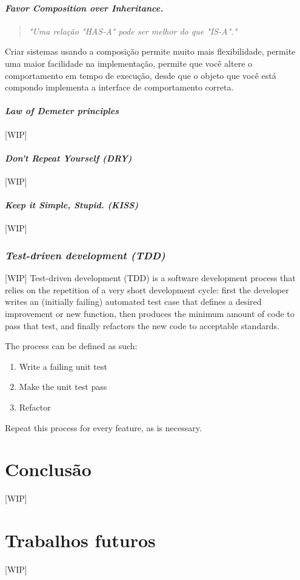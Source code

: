 \documentclass[12pt]{article}
\begin{document}
\subsection{\textit{Favor Composition over Inheritance.}} \label{sec:favor_composition}
\begin{quote}
\textit{"Uma relação "HAS-A" pode ser melhor do que "IS-A"."}\cite{HEADFIRST_DESIGN_PATTERN}
\end{quote}

Criar sistemas usando a composição permite muito mais flexibilidade, permite uma maior facilidade na implementação, permite que você altere o comportamento em tempo de execução, desde que o objeto que você está compondo implementa a interface de comportamento correta. 


\subsection{\textit{Law of Demeter principles}} \label{sec:law_of_demeter}
[WIP]

\subsection{\textit{Don't Repeat Yourself (DRY)}} \label{sec:dey}
[WIP]

\subsection{\textit{Keep it Simple, Stupid. (KISS)}} \label{sec:kiss}
[WIP]

\section{\textsl{Test-driven development (TDD)}} \label{sec:tdd}
[WIP]
Test-driven development (TDD) is a software development process that relies on the repetition of a very short development cycle: first the developer writes an (initially failing) automated test case that defines a desired improvement or new function, then produces the minimum amount of code to pass that test, and finally refactors the new code to acceptable standards.

The process can be defined as such:
\begin{enumerate}
	\item Write a failing unit test
	\item Make the unit test pass
	\item Refactor
\end{enumerate}
  

Repeat this process for every feature, as is necessary.

\part{Conclusão} \label{sec:conclusao}
[WIP]

\part{Trabalhos futuros} \label{sec:trabalhos_futuros}
[WIP]



\end{document}
